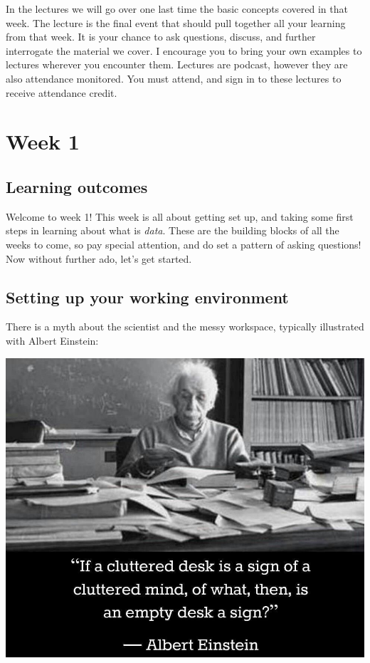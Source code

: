 \documentclass[]{book}
\theoremstyle{definition}
\theoremstyle{definition}
\theoremstyle{definition}
\theoremstyle{remark}
\begin{document}
In the lectures we will go over one last time the basic concepts covered
in that week. The lecture is the final event that should pull together
all your learning from that week. It is your chance to ask questions,
discuss, and further interrogate the material we cover. I encourage you
to bring your own examples to lectures wherever you encounter them.
Lectures are podcast, however they are also attendance monitored. You
must attend, and sign in to these lectures to receive attendance credit.

\hypertarget{week1}{%
\chapter{Week 1}\label{week1}}

\hypertarget{learning-outcomes}{%
\section{Learning outcomes}\label{learning-outcomes}}

Welcome to week 1! This week is all about getting set up, and taking
some first steps in learning about what is \emph{data}. These are the
building blocks of all the weeks to come, so pay special attention, and
do set a pattern of asking questions! Now without further ado, let's get
started.

\hypertarget{setting-up-your-working-environment}{%
\section{Setting up your working
environment}\label{setting-up-your-working-environment}}

There is a myth about the scientist and the messy workspace, typically
illustrated with Albert Einstein:

\includegraphics[width=13.33in]{imgs/einstein_desk}
\end{document}
